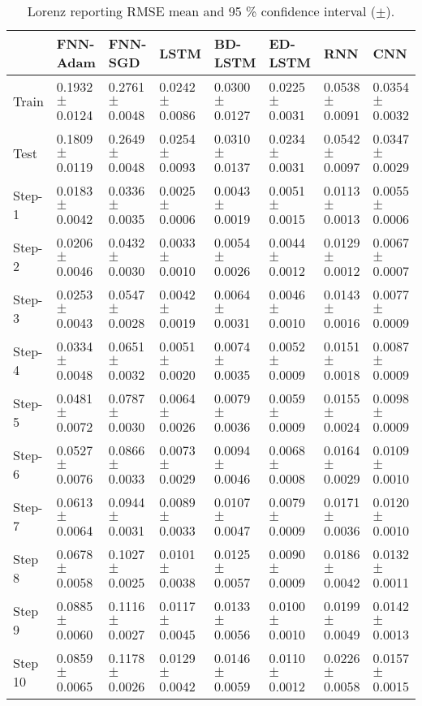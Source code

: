 \documentclass{ieeeaccess}
\begin{document}
\begin{table*}[htbp]
\smaller 
\caption{Lorenz reporting RMSE mean and 95 \% confidence interval   ($\pm$).}
\label{tab:lorenz}
\begin{tabular}{llllllll}
\hline
 &  FNN-Adam& FNN-SGD & LSTM & BD-LSTM  & ED-LSTM & RNN & CNN\\
\hline
\hline
	
Train &  
0.1932$\pm$	0.0124&
0.2761$\pm$	0.0048&
0.0242$\pm$	0.0086&
0.0300$\pm$	0.0127&
0.0225$\pm$	0.0031&
0.0538$\pm$	0.0091&0.0354$\pm$	0.0032\\
Test &  
0.1809$\pm$	0.0119&
0.2649$\pm$	0.0048&
0.0254$\pm$	0.0093&
0.0310$\pm$	0.0137&
0.0234$\pm$	0.0031&
0.0542$\pm$	0.0097&	0.0347$\pm$	0.0029\\
Step-1 &  
0.0183$\pm$	0.0042&
0.0336$\pm$	0.0035&
0.0025$\pm$	0.0006&
0.0043$\pm$	0.0019&
0.0051$\pm$	0.0015&
0.0113$\pm$	0.0013&	0.0055$\pm$	0.0006\\
Step-2 &  
0.0206$\pm$	0.0046&
0.0432$\pm$	0.0030&
0.0033$\pm$	0.0010&
0.0054$\pm$	0.0026&
0.0044$\pm$	0.0012&
0.0129$\pm$	0.0012&	0.0067	$\pm$0.0007\\
Step-3 &    
0.0253$\pm$	0.0043&
0.0547$\pm$	0.0028&
0.0042$\pm$	0.0019&
0.0064$\pm$	0.0031&
0.0046$\pm$	0.0010&
0.0143$\pm$	0.0016&	0.0077$\pm$	0.0009\\
Step-4 &    
0.0334$\pm$	0.0048&
0.0651$\pm$	0.0032&
0.0051$\pm$	0.0020&
0.0074$\pm$	0.0035&
0.0052$\pm$	0.0009&
0.0151$\pm$	0.0018&0.0087$\pm$	0.0009\\
Step-5 &    
0.0481$\pm$	0.0072&
0.0787$\pm$	0.0030&
0.0064$\pm$	0.0026&
0.0079$\pm$	0.0036&
0.0059$\pm$	0.0009&
0.0155$\pm$	0.0024&	0.0098$\pm$	0.0009\\
Step-6 &    
0.0527$\pm$	0.0076&
0.0866$\pm$	0.0033&
0.0073$\pm$	0.0029&
0.0094$\pm$	0.0046&
0.0068$\pm$	0.0008&
0.0164$\pm$	0.0029&	0.0109	$\pm$0.0010\\
Step-7 &    
0.0613$\pm$	0.0064&
0.0944$\pm$	0.0031&
0.0089$\pm$	0.0033&
0.0107$\pm$	0.0047&
0.0079$\pm$	0.0009&
0.0171$\pm$	0.0036&	0.0120	$\pm$0.0010\\
Step 8 &    
0.0678$\pm$	0.0058&
0.1027$\pm$	0.0025&
0.0101$\pm$	0.0038&
0.0125$\pm$	0.0057&
0.0090$\pm$	0.0009&
0.0186$\pm$	0.0042&	0.0132$\pm$	0.0011\\
Step 9 &    
0.0885$\pm$	0.0060&
0.1116$\pm$	0.0027&
0.0117$\pm$	0.0045&
0.0133$\pm$	0.0056&
0.0100$\pm$	0.0010&
0.0199$\pm$	0.0049&	0.0142$\pm$	0.0013\\
Step 10 &    
0.0859$\pm$	0.0065&
0.1178$\pm$	0.0026&
0.0129$\pm$	0.0042&
0.0146$\pm$	0.0059&
0.0110$\pm$	0.0012&
0.0226$\pm$	0.0058&	0.0157$\pm$	0.0015\\
\hline
 
\end{tabular}

\end{table*}
\end{document}
